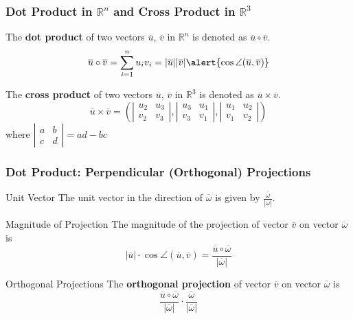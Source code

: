 \begin{frame}
\frametitle{Dot Product in $\mathbb{R}^{n}$ and Cross Product in $\mathbb{R}^{3}$}
\begin{definition}
The \textbf{\alert{dot product}} of two vectors $\overline{u}$, $\overline{v}$ in $\mathbb{R}^{n}$ is denoted as $\overline{u}\circ\overline{v}$.
\[\overline{u}\circ\overline{v}=\sum_{i=1}^{n}u_{i}v_{i}=|\overline{u}||\overline{v}|\alert{\cos\angle (\overline{u},\overline{v})}
\]
\end{definition}
\begin{definition}
The \textbf{\alert{cross product}} of two vectors $\overline{u}$, $\overline{v}$ in $\mathbb{R}^{3}$ is denoted as $\overline{u}\times \overline{v}$.
\[
\overline{u}\times \overline{v}=\left(\left|\begin{matrix}u_{2}&u_{3}\\v_{2}&v_{3}\end{matrix}\right|,\left|\begin{matrix}u_{3}&u_{1}\\v_{3}&v_{1}\end{matrix}\right|,\left|\begin{matrix}u_{1}&u_{2}\\v_{1}&v_{2}\end{matrix}\right|\right)
\]
where $\left|\begin{matrix}a&b\\c&d\end{matrix}\right|=ad-bc$
\end{definition}
\end{frame}
\begin{frame}
\frametitle{Dot Product: Perpendicular (Orthogonal) Projections}
\begin{block}{Unit Vector}
The \alert{unit vector} in the direction of $\overline{\omega}$
 is given by $\frac{\overline{\omega}}{|\overline{\omega}|}$.
\end{block}
\begin{block}{Magnitude of Projection}
The \alert{magnitude} of the projection of vector $\overline{v}$ on vector $\overline{\omega}$ is
\[|\overline{u}|\cdot\cos\angle (\overline{u},\overline{v})=\frac{\overline{u}\circ\overline{\omega}}{|\overline{\omega}|}\]
\end{block}
\begin{block}{Orthogonal Projections}
The \textbf{\alert{orthogonal projection}} of vector $\overline{v}$ on vector $\overline{\omega}$ is
\[\frac{\overline{u}\circ\overline{\omega}}{|\overline{\omega}|}\cdot \frac{\overline{\omega}}{|\overline{\omega}|}\]
\end{block}
\end{frame}
